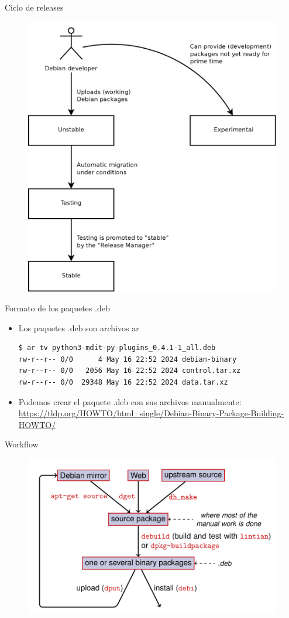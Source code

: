 \documentclass{beamer}
\begin{document}
\begin{frame}{Ciclo de releases}
 \begin{figure}
   \centering
   \includegraphics[width=0.7\linewidth]{images/release-cycle.png}
 \end{figure}
\end{frame}

\begin{frame}[fragile=singleslide]{Formato de los paquetes .deb}
  \begin{itemize}
  \item Los paquetes .deb son archivos ar
\begin{verbatim}
$ ar tv python3-mdit-py-plugins_0.4.1-1_all.deb
rw-r--r-- 0/0      4 May 16 22:52 2024 debian-binary
rw-r--r-- 0/0   2056 May 16 22:52 2024 control.tar.xz
rw-r--r-- 0/0  29348 May 16 22:52 2024 data.tar.xz
\end{verbatim}
  \item Podemos crear el paquete .deb con sus archivos manualmente: \url{https://tldp.org/HOWTO/html_single/Debian-Binary-Package-Building-HOWTO/}
  \end{itemize}
\end{frame}

\begin{frame}{Workflow}
 \begin{figure}
   \centering
   \includegraphics[width=0.7\linewidth]{images/workflow.png}
 \end{figure}
\end{frame}
\end{document}
